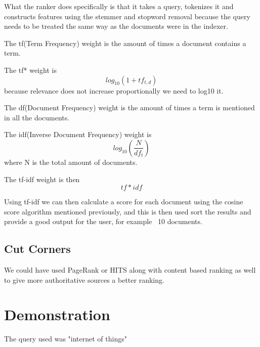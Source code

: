 	What the ranker does specifically is that it takes a query, tokenizes it and constructs features using the stemmer and stopword removal because the query needs to be treated the same way as the documents were in the indexer.
	
	The tf(Term Frequency) weight is the amount of times a document contains a term.
	
	The tf* weight is $$log_{10}(1+tf_{t,d})$$ because relevance does not increase proportionally we need to log10 it.
	
	The df(Document Frequency) weight is the amount of times a term is mentioned in all the documents.
	
	The idf(Inverse Document Frequency) weight is $$log_{10}(\frac{N}{df_{t}})$$ where N is the total amount of documents.
	
	The tf-idf weight is then $$tf*idf$$
	
	Using tf-idf we can then calculate a score for each document using the cosine score algorithm mentioned previously, and this is then used sort the results and provide a good output for the user, for example ~10 documents.
	
	\subsection{Cut Corners}
	We could have used PageRank or HITS along with content based ranking as well to give more authoritative sources a better ranking.
	
	\section{Demonstration}
	The query used was "internet of things"
	


